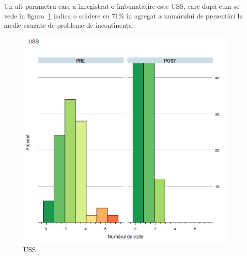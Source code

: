 \documentclass[12pt,draft]{article}
\begin{document}
  Un alt parametru care a înregistrat o îmbunatățire este \acf{USS}, care după cum se vede în figura~\ref{fig:incoResUSS} indica o scădere cu 71\% în agregat a numărului de prezentări la medic cauzate de probleme de incontinența.
  \begin{figure}[H]
    \centering
    \includegraphics[width=0.8\linewidth]{incoResUSS}
    \caption{\acf{USS}}
    \label{fig:incoResUSS}
  \end{figure}
  
\end{document}
